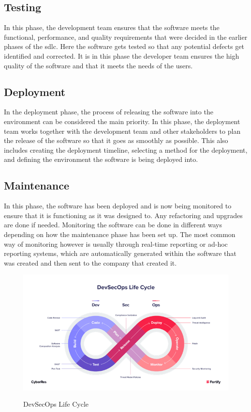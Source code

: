 \subsection{Testing}
In this phase, the development team ensures that the software meets the functional, performance, and quality requirements that were decided in the earlier phases of the \acrshort{sdlc}. Here the software gets tested so that any potential defects get identified and corrected. It is in this phase the developer team ensures the high quality of the software and that it meets the needs of the users. \cite{TestingSDLC}
 
\subsection{Deployment}
In the deployment phase, the process of releasing the software into the environment can be considered the main priority. In this phase, the deployment team works together with the development team and other stakeholders to plan the release of the software so that it goes as smoothly as possible. This also includes creating the deployment timeline, selecting a method for the deployment, and defining the environment the software is being deployed into. \cite{DeploymentSDLC}

\subsection{Maintenance} 
In this phase, the software has been deployed and is now being monitored to ensure that it is functioning as it was designed to. Any refactoring and upgrades are done if needed. Monitoring the software can be done in different ways depending on how the maintenance phase has been set up. The most common way of monitoring however is usually through real-time reporting or ad-hoc reporting systems, which are automatically generated within the software that was created and then sent to the company that created it.\cite{MaintenanceSDLC} 


\begin{figure}[H]
    \centering
    \includegraphics[width=0.8\columnwidth]{Images/devsec.png}
    \caption{DevSecOps Life Cycle}
    \label{fig: DevSecOps Life Cycle}\cite{devsecopsbilde}
\end{figure}


